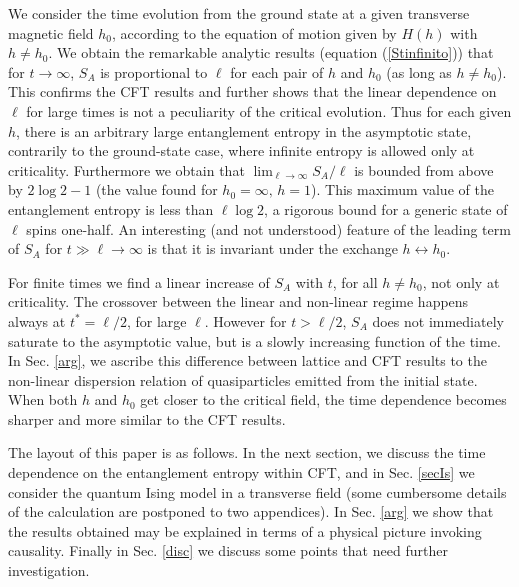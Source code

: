 We consider the time evolution from the ground state at a given transverse 
magnetic field $h_0$, according to the equation of motion given by 
$H(h)$ with $h\neq h_0$.
We obtain the remarkable analytic results (equation (\ref{Stinfinito})) that 
for $t\rightarrow\infty$, $S_A$ is proportional to $\ell$ for each pair 
of $h$ and $h_0$ (as long as $h\neq h_0$).
This confirms the CFT results and further shows that the linear 
dependence on $\ell$ for large times is not a peculiarity of the critical 
evolution. 
Thus for each given $h$, there is an arbitrary large entanglement entropy 
in the asymptotic state, contrarily to the ground-state case, where infinite 
entropy is allowed only at criticality.
Furthermore we obtain that $\lim_{\ell\rightarrow\infty} S_A/\ell$ 
is bounded from 
above by $2\log 2-1$ (the value found for $h_0=\infty,\,h=1$). 
This maximum value of the entanglement entropy is less than $\ell \log 2$,  
a rigorous bound for a generic state of $\ell$ spins one-half.
An interesting (and not understood) feature of the leading term of $S_A$ for 
$t\gg \ell\rightarrow\infty$ is that it is invariant under the exchange 
$h\leftrightarrow h_0$.

For finite times we find a linear increase of $S_A$ with $t$,
for all $h\neq h_0$, not only at criticality. 
The crossover between the linear and non-linear regime happens always at 
$t^*=\ell/2$, for large $\ell$.
However for $t>\ell/2$, $S_A$ does not immediately saturate to the 
asymptotic value, but is a slowly increasing function of the time.
In Sec. \ref{arg}, we ascribe this difference between lattice and CFT
results to the non-linear dispersion relation of quasiparticles emitted 
from the initial state. 
When both $h$ and $h_0$ get closer to the critical field,
the time dependence becomes sharper and more similar to the CFT results.


The layout of this paper is as follows. In the next section, we discuss the 
time dependence on the entanglement entropy within CFT, and in 
Sec. \ref{secIs} we consider the quantum Ising model in a transverse 
field (some cumbersome details of the calculation are postponed to 
two appendices).
In Sec. \ref{arg} we show that the results obtained may be explained in terms
of a physical picture invoking causality. 
Finally in Sec. \ref{disc} we discuss some points that 
need further investigation.














